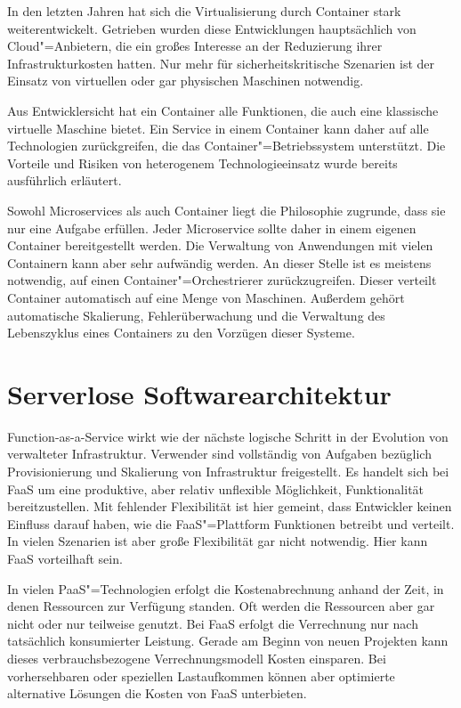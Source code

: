 In den letzten Jahren hat sich die Virtualisierung durch Container stark weiterentwickelt. Getrieben wurden diese Entwicklungen hauptsächlich von Cloud"=Anbietern, die ein großes Interesse an der Reduzierung ihrer Infrastrukturkosten hatten. Nur mehr für sicherheitskritische Szenarien ist der Einsatz von virtuellen oder gar physischen Maschinen notwendig.

Aus Entwicklersicht hat ein Container alle Funktionen, die auch eine klassische virtuelle Maschine bietet. Ein Service in einem Container kann daher auf alle Technologien zurückgreifen, die das Container"=Betriebssystem unterstützt. Die Vorteile und Risiken von heterogenem Technologieeinsatz wurde bereits ausführlich erläutert.

Sowohl Microservices als auch Container liegt die Philosophie zugrunde, dass sie nur eine Aufgabe erfüllen. Jeder Microservice sollte daher in einem eigenen Container bereitgestellt werden. Die Verwaltung von Anwendungen mit vielen Containern kann aber sehr aufwändig werden. An dieser Stelle ist es meistens notwendig, auf einen Container"=Orchestrierer zurückzugreifen. Dieser verteilt Container automatisch auf eine Menge von Maschinen. Außerdem gehört automatische Skalierung, Fehlerüberwachung und die Verwaltung des Lebenszyklus eines Containers zu den Vorzügen dieser Systeme.

\section{Serverlose Softwarearchitektur}

Function-as-a-Service wirkt wie der nächste logische Schritt in der Evolution von verwalteter Infrastruktur. Verwender sind vollständig von Aufgaben bezüglich Provisionierung und Skalierung von Infrastruktur freigestellt. Es handelt sich bei FaaS um eine produktive, aber relativ unflexible Möglichkeit, Funktionalität bereitzustellen. Mit fehlender Flexibilität ist hier gemeint, dass Entwickler keinen Einfluss darauf haben, wie die FaaS"=Plattform Funktionen betreibt und verteilt. In vielen Szenarien ist aber große Flexibilität gar nicht notwendig. Hier kann FaaS vorteilhaft sein.

In vielen PaaS"=Technologien erfolgt die Kostenabrechnung anhand der Zeit, in denen Ressourcen zur Verfügung standen. Oft werden die Ressourcen aber gar nicht oder nur teilweise genutzt. Bei FaaS erfolgt die Verrechnung nur nach tatsächlich konsumierter Leistung. Gerade am Beginn von neuen Projekten kann dieses verbrauchsbezogene Verrechnungsmodell Kosten einsparen. Bei vorhersehbaren oder speziellen Lastaufkommen können aber optimierte alternative Lösungen die Kosten von FaaS unterbieten.

